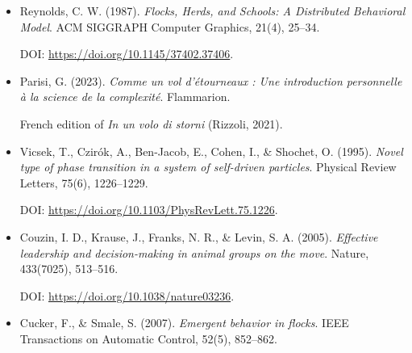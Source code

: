 \documentclass[10pt,a4paper]{article}
\begin{document}
\begin{itemize}


\item
Reynolds, C. W. (1987).
\emph{Flocks, Herds, and Schools:
A Distributed Behavioral Model}.
ACM SIGGRAPH Computer Graphics,
21(4), 25--34.

DOI:
\url{https://doi.org/10.1145/37402.37406}.


\item
Parisi, G. (2023).
\emph{Comme un vol d'\'etourneaux :
Une introduction personnelle
\`a la science de la complexit\'e}.
Flammarion.

French edition of
\emph{In un volo di storni}
(Rizzoli, 2021).


\item
Vicsek, T., Czir\'ok, A.,
Ben-Jacob, E., Cohen, I.,
\& Shochet, O. (1995).
\emph{Novel type of phase transition
in a system of self-driven particles}.
Physical Review Letters,
75(6), 1226--1229.

DOI:
\url{https://doi.org/10.1103/PhysRevLett.75.1226}.


\item
Couzin, I. D., Krause, J.,
Franks, N. R.,
\& Levin, S. A. (2005).
\emph{Effective leadership and
decision-making in animal groups on the move}.
Nature, 433(7025), 513--516.

DOI:
\url{https://doi.org/10.1038/nature03236}.


\item
Cucker, F., \& Smale, S. (2007).
\emph{Emergent behavior in flocks}.
IEEE Transactions on Automatic Control,
52(5), 852--862.


\end{itemize}
\end{document}
